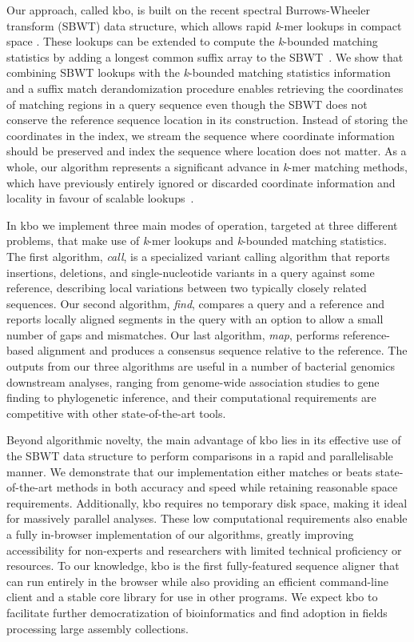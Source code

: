\documentclass[unnumsec,webpdf,modern,large]{biorxiv}%
\theoremstyle{thmstyleone}%
\theoremstyle{thmstyletwo}%
\theoremstyle{thmstylethree}%
\begin{document}
Our approach, called {\sf kbo}, is built on the recent spectral Burrows-Wheeler transform (SBWT) data structure, which allows rapid \emph{k}-mer lookups in compact space \cite{alanko2023small}. These lookups can be extended to compute the \emph{k}-bounded matching statistics by adding a longest common suffix array to the SBWT~\cite{alanko2023longest,alanko2024finimizers}. We show that combining SBWT lookups with the \emph{k}-bounded matching statistics information and a suffix match derandomization procedure enables retrieving the coordinates of matching regions in a query sequence even though the SBWT does not conserve the reference sequence location in its construction. Instead of storing the coordinates in the index, we stream the sequence where coordinate information should be preserved and index the sequence where location does not matter. As a whole, our algorithm represents a significant advance in \emph{k}-mer matching methods, which have previously entirely ignored or discarded coordinate information and locality in favour of scalable lookups~\cite{alanko2023themisto,fan2024fulgor}.

In {\sf kbo} we implement three main modes of operation, targeted at three different problems, that make use of \emph{k}-mer lookups and \emph{k}-bounded matching statistics. The first algorithm, \textit{call}, is a specialized variant calling algorithm that reports insertions, deletions, and single-nucleotide variants in a query against some reference, describing local variations between two typically closely related sequences. Our second algorithm, \textit{find}, compares a query and a reference and reports locally aligned segments in the query with an option to allow a small number of gaps and mismatches. Our last algorithm, \textit{map}, performs reference-based alignment and produces a consensus sequence relative to the reference. The outputs from our three algorithms are useful in a number of bacterial genomics downstream analyses, ranging from genome-wide association studies to gene finding to phylogenetic inference, and their computational requirements are competitive with other state-of-the-art tools.

Beyond algorithmic novelty, the main advantage of {\sf kbo} lies in its effective use of the SBWT data structure to perform comparisons in a rapid and parallelisable manner. We demonstrate that our implementation either matches or beats state-of-the-art methods in both accuracy and speed while retaining reasonable space requirements. Additionally, {\sf kbo} requires no temporary disk space, making it ideal for massively parallel analyses. These low computational requirements also enable a fully in-browser implementation of our algorithms, greatly improving accessibility for non-experts and researchers with limited technical proficiency or resources. To our knowledge, {\sf kbo} is the first fully-featured sequence aligner that can run entirely in the browser while also providing an efficient command-line client and a stable core library for use in other programs. We expect {\sf kbo} to facilitate further democratization of bioinformatics and find adoption in fields processing large assembly collections.
\end{document}
